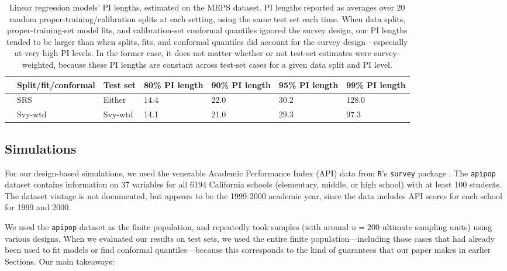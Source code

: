 \documentclass[10.5pt, letterpaper]{article}
\numberwithin{table}{section}
\numberwithin{figure}{section}
\numberwithin{equation}{section}
\begin{document}
\begin{table}[t!]
\centering
\begin{tabular}{rllllll}
  \hline
  & Split/fit/conformal & Test set & 80\% PI length & 90\% PI length  & 95\% PI length & 99\% PI length\\
  \hline
  & SRS & Either & 14.4 & 22.0 & 30.2 & 128.0 \\
  & Svy-wtd & Svy-wtd & 14.1 & 21.0 & 29.3 & 97.3 \\
  \hline
\end{tabular}
\caption{Linear regression models' PI lengths, estimated on the MEPS dataset. PI lengths reported as averages over 20 random proper-training/calibration splits at each setting, using the same test set each time. When data splits, proper-training-set model fits, and calibration-set conformal quantiles ignored the survey design, our PI lengths tended to be larger than when splits, fits, and conformal quantiles did account for the survey design---especially at very high PI levels. In the former case, it does not matter whether or not test-set estimates were survey-weighted, because these PI lengths are constant across test-set cases for a given data split and PI level.}
\label{table:meps_len}
\end{table}










\subsection{Simulations}\label{sec:Sims}

For our design-based simulations, we used the venerable Academic Performance Index (API) data \citep{cdoe2018academic} from \texttt{R}'s \texttt{survey} package \citep{lumley2021survey}. The \texttt{apipop} dataset contains information on 37 variables for all 6194 California schools (elementary, middle, or high school) with at least 100 students. The dataset vintage is not documented, but appears to be the 1999-2000 academic year, since the data includes API scores for each school for 1999 and 2000.

We used the \texttt{apipop} dataset as the finite population, and repeatedly took samples (with around $n=200$ ultimate sampling units) using various designs. When we evaluated our results on test sets, we used the entire finite population---including those cases that had already been used to fit models or find conformal quantiles---because this corresponds to the kind of guarantees that our paper makes in earlier Sections.
Our main takeaways:
\end{document}

